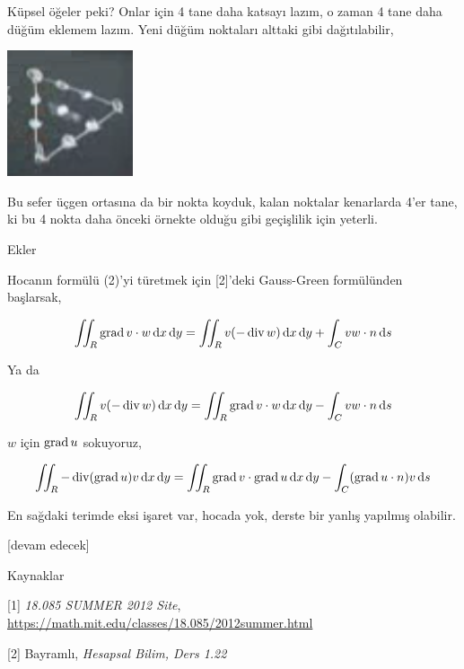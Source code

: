 \documentclass[12pt,fleqn]{article}\usepackage{../../common}
\begin{document}
Küpsel öğeler peki? Onlar için 4 tane daha katsayı lazım, o zaman 4 tane
daha düğüm eklemem lazım. Yeni düğüm noktaları alttaki gibi dağıtılabilir,

\includegraphics[width=10em]{compscieng_1_27_07.png}

Bu sefer üçgen ortasına da bir nokta koyduk, kalan noktalar kenarlarda 4'er
tane, ki bu 4 nokta daha önceki örnekte olduğu gibi geçişlilik için yeterli.

Ekler

Hocanın formülü (2)'yi türetmek için [2]'deki Gauss-Green formülünden başlarsak,

$$
\iint_R \operatorname{grad} v \cdot w  \,\mathrm{d} x \,\mathrm{d} y =
\iint_R v (-\operatorname{div} w) \,\mathrm{d} x \,\mathrm{d} y + \int_C v w \cdot n \,\mathrm{d} s
$$

Ya da

$$
\iint_R v (-\operatorname{div} w) \,\mathrm{d} x \,\mathrm{d} y  =
\iint_R \operatorname{grad} v \cdot w  \,\mathrm{d} x \,\mathrm{d} y - \int_C v w \cdot n \,\mathrm{d} s
$$

$w$ için $\operatorname{grad} u$ sokuyoruz,

$$
\iint_R -\operatorname{div} (\operatorname{grad} u) v \,\mathrm{d} x \,\mathrm{d} y  =
\iint_R \operatorname{grad} v \cdot \operatorname{grad} u  \,\mathrm{d} x \,\mathrm{d} y - \int_C (\operatorname{grad} u \cdot n) v \,\mathrm{d} s
$$

En sağdaki terimde eksi işaret var, hocada yok, derste bir yanlış yapılmış
olabilir.

[devam edecek]

Kaynaklar

[1] {\em 18.085 SUMMER 2012 Site},
    \url{https://math.mit.edu/classes/18.085/2012summer.html}

[2] Bayramlı, {\em Hesapsal Bilim, Ders 1.22} 
    
\end{document}
